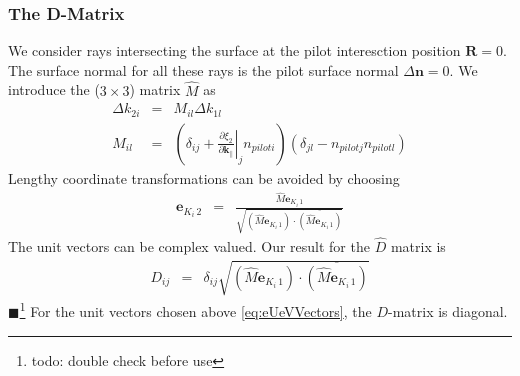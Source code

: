 \documentclass[12pt,a4paper,twoside,openright,BCOR10mm,headsepline,titlepage,abstracton,chapterprefix,final]{scrreprt}
\newcommand\Vector[1]{{\mathbf{#1}}}
\newcommand\wavenumber{k}
\newcommand\Wavevector{\Vector{\wavenumber}}
\newcommand{\remark}[1]{{\color{red}$\blacksquare$}\footnote{{\color{red}#1}}}
\begin{document}
\subsubsection{The D-Matrix}
We consider rays intersecting the surface at the pilot interesction position $\Vector{R} = 0$.
The surface normal for all these rays is the pilot surface normal $\Delta \Vector{n} = 0$.
We introduce the ($3\times3$) matrix $\hat{M}$ as
\begin{eqnarray}
 \Delta \wavenumber_{2i} &=& M_{il} \Delta \wavenumber_{1l} \\
 M_{il}
 &=& 
 \left( 
       \delta_{ij}
       + \left. \frac{\partial \xi_2}{\partial \Wavevector_{\parallel}} \right|_j n_{pilot i}
 \right) 
 ( \delta_{jl} -  n_{pilot j} n_{pilot l} )
\end{eqnarray}
Lengthy coordinate transformations can be avoided by choosing
\begin{eqnarray}
  \Vector{e}_{K_i\,2} &=& \frac{ \hat{M} \Vector{e}_{K_i\,1} }{\sqrt{ (\hat{M} \Vector{e}_{K_i\,1})\cdot \overline{(\hat{M} \Vector{e}_{K_i\,1})} }}
  \label{eq:eUeVVectors}
\end{eqnarray}
The unit vectors can be complex valued.
Our result for the $\hat{D}$ matrix is
\begin{eqnarray}
 D_{ij} &=&  \delta_{ij}
 \sqrt{ (\hat{M} \Vector{e}_{K_i\,1})\cdot \overline{(\hat{M} \Vector{e}_{K_i\,1})} } 
\end{eqnarray}
\remark{todo: double check before use}
For the unit vectors chosen above \eqref{eq:eUeVVectors}, the $D$-matrix is diagonal.
\end{document}
